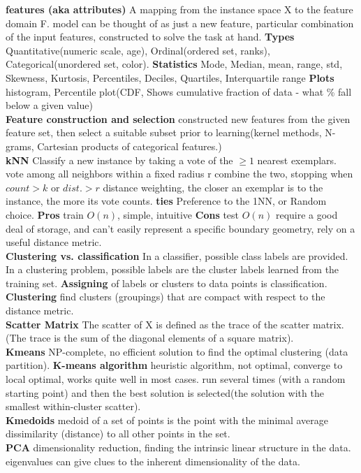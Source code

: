 \documentclass[cheatsheet.tex]{subfiles}
\begin{document}
\textbf{features (aka attributes)} A mapping from the instance space X to the feature domain F. model can be thought of as just a new feature, particular combination of the input features, constructed to solve the task at hand. \textbf{Types} Quantitative(numeric scale, age), Ordinal(ordered set, ranks), Categorical(unordered set, color). \textbf{Statistics} Mode, Median, mean, range, std, Skewness, Kurtosis, Percentiles, Deciles, Quartiles, Interquartile range \textbf{Plots} histogram, Percentile plot(CDF, Shows cumulative fraction of data - what \% fall below a given value)
\\
\textbf{Feature construction and selection} constructed new features from the given feature set, then select a suitable subset prior to learning(kernel methods, N-grams, Cartesian products of categorical features.)
\\
\textbf{kNN} \textbullet Classify a new instance by taking a vote of the $\geq1$ nearest exemplars. \textbullet vote among all neighbors within a fixed radius r \textbullet combine the two, stopping when $count > k$ or $dist. > r$ \textbullet distance weighting, the closer an exemplar is to the instance, the more its vote counts. \textbf{ties} Preference to the 1NN, or Random choice. 
\textbf{Pros} train $O(n)$, simple, intuitive 
\textbf{Cons} test $O(n)$ require a good deal of storage, and can't easily represent a specific boundary geometry, rely on a useful distance metric.
\\
\textbf{Clustering vs. classification} In a classifier, possible class labels are provided. In a clustering problem, possible labels are the cluster labels learned from the training set. \textbf{Assigning} of labels or clusters to data points is classification.
\\
\textbf{Clustering} find clusters (groupings) that are compact with respect to the distance metric. 
\\
\textbf{Scatter Matrix} The scatter of X is defined as the trace of the scatter matrix.(The trace is the sum of the diagonal elements of a square matrix). 
\\
\textbf{Kmeans} NP-complete, no efficient solution to find the optimal clustering (data partition). \textbf{K-means algorithm} heuristic algorithm, not optimal, converge to local optimal, works quite well in most cases. run several times (with a random starting point) and then the best solution is selected(the solution with the smallest within-cluster scatter). 
\\
\textbf{Kmedoids} medoid of a set of points is the point with the minimal average dissimilarity (distance) to all other points in the set. 
\\
\textbf{PCA} dimensionality reduction, finding the intrinsic linear structure in the data. eigenvalues can give clues to the inherent dimensionality of the data. 
\end{document}
